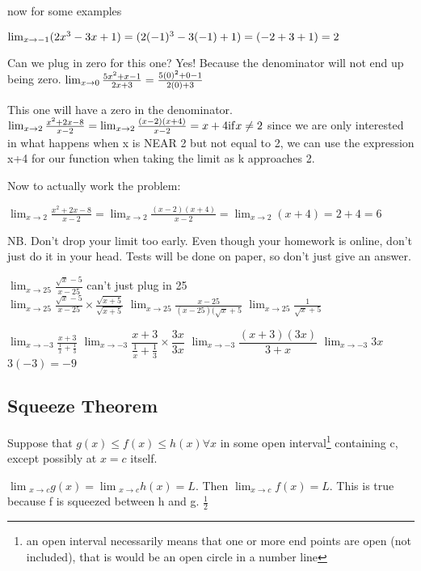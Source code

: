 \documentclass[12pt]{article}
\begin{document}
now for some examples

$\lim_{x \to -1}(2x^3 - 3x + 1)\\
= (2(-1)^3 - 3(-1) + 1)\\
= (-2 + 3 + 1)\\
= 2$

Can we plug in zero for this one? Yes! Because the denominator will not end up being zero.
$\lim_{x \to 0}\frac{5x^2 + x - 1}{2x + 3}\\
=\frac{5(0)^2 + 0 - 1}{2(0) + 3}
$

This one will have a zero in the denominator.
$\lim_{x \to 2}\frac{x^2 +2x-8}{x-2}\\
=\lim_{x \to 2}\frac{(x-2)(x+4)}{x-2} = x+4 \mathrm{if}  x \neq 2$
since we are only interested in what happens when x is NEAR 2 but not equal to 2, we can use the expression
x+4 for our function when taking the limit as k approaches 2.

Now to actually work the problem:

$
\lim_{x \to 2}\frac{x^2 +2x-8}{x-2} = \lim_{x \to 2}\frac{(x-2)(x+4)}{x-2} = \lim_{x \to 2}(x+4) = 2+4 = 6
$

NB. Don't drop your limit too early. Even though your homework is online, don't just do it in your head. Tests
will be done on paper, so don't just give an answer.


$\lim_{x \to 25}\frac{\sqrt{x}-5}{x - 25}$ can't just plug in 25\\
$\lim_{x \to 25}\frac{\sqrt{x}-5}{x - 25} \times \frac{\sqrt{x + 5}}{\sqrt{x + 5}}$
$\lim_{x \to 25}\frac{x-25}{(x - 25)(\sqrt{x}+5}$
$\lim_{x \to 25}\frac{1}{\sqrt{x}+5}$

$\lim_{x \to -3}\frac{x+3}{\frac{1}{x}+\frac{1}{3}}$
$\lim_{x \to -3}\dfrac{x+3}{\frac{1}{x}+\frac{1}{3}} \times \dfrac{3x}{3x}$
$\lim_{x \to -3} \dfrac{(x+3)(3x)}{3+x}$
$\lim_{x \to -3} 3x$
$3(-3) = -9$

\subsection{Squeeze Theorem}

Suppose that $g(x) \leq f(x) \leq h(x) \forall x$ in some open interval\footnote{an open interval necessarily
  means that one or more end points are open (not included), that is would be an open circle in a number line} containing c, except possibly at $x=c$
itself.

$\lim{_{x \to c}}g(x) = \lim{_{x \to c}}h(x) = L$. Then  $\lim_{x \to c}f(x) = L$.
This is true because f is squeezed between h and g.
$\frac{1}{2}$
\end{document}
